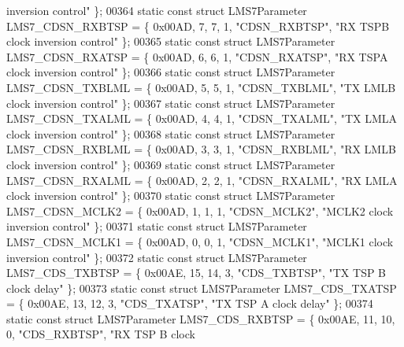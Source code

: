 \begin{DoxyCode}
{       inversion control"} \};
00364 \textcolor{keyword}{static} \textcolor{keyword}{const} \textcolor{keyword}{struct }LMS7Parameter LMS7_CDSN_RXBTSP = \{ 0x00AD, 7, 7, 1, \textcolor{stringliteral}{"CDSN\_RXBTSP"}, \textcolor{stringliteral}{"RX TSPB clock
       inversion control"} \};
00365 \textcolor{keyword}{static} \textcolor{keyword}{const} \textcolor{keyword}{struct }LMS7Parameter LMS7_CDSN_RXATSP = \{ 0x00AD, 6, 6, 1, \textcolor{stringliteral}{"CDSN\_RXATSP"}, \textcolor{stringliteral}{"RX TSPA clock
       inversion control"} \};
00366 \textcolor{keyword}{static} \textcolor{keyword}{const} \textcolor{keyword}{struct }LMS7Parameter LMS7_CDSN_TXBLML = \{ 0x00AD, 5, 5, 1, \textcolor{stringliteral}{"CDSN\_TXBLML"}, \textcolor{stringliteral}{"TX LMLB clock
       inversion control"} \};
00367 \textcolor{keyword}{static} \textcolor{keyword}{const} \textcolor{keyword}{struct }LMS7Parameter LMS7_CDSN_TXALML = \{ 0x00AD, 4, 4, 1, \textcolor{stringliteral}{"CDSN\_TXALML"}, \textcolor{stringliteral}{"TX LMLA clock
       inversion control"} \};
00368 \textcolor{keyword}{static} \textcolor{keyword}{const} \textcolor{keyword}{struct }LMS7Parameter LMS7_CDSN_RXBLML = \{ 0x00AD, 3, 3, 1, \textcolor{stringliteral}{"CDSN\_RXBLML"}, \textcolor{stringliteral}{"RX LMLB clock
       inversion control"} \};
00369 \textcolor{keyword}{static} \textcolor{keyword}{const} \textcolor{keyword}{struct }LMS7Parameter LMS7_CDSN_RXALML = \{ 0x00AD, 2, 2, 1, \textcolor{stringliteral}{"CDSN\_RXALML"}, \textcolor{stringliteral}{"RX LMLA clock
       inversion control"} \};
00370 \textcolor{keyword}{static} \textcolor{keyword}{const} \textcolor{keyword}{struct }LMS7Parameter LMS7_CDSN_MCLK2 = \{ 0x00AD, 1, 1, 1, \textcolor{stringliteral}{"CDSN\_MCLK2"}, \textcolor{stringliteral}{"MCLK2 clock inversion
       control"} \};
00371 \textcolor{keyword}{static} \textcolor{keyword}{const} \textcolor{keyword}{struct }LMS7Parameter LMS7_CDSN_MCLK1 = \{ 0x00AD, 0, 0, 1, \textcolor{stringliteral}{"CDSN\_MCLK1"}, \textcolor{stringliteral}{"MCLK1 clock inversion
       control"} \};
00372 \textcolor{keyword}{static} \textcolor{keyword}{const} \textcolor{keyword}{struct }LMS7Parameter LMS7_CDS_TXBTSP = \{ 0x00AE, 15, 14, 3, \textcolor{stringliteral}{"CDS\_TXBTSP"}, \textcolor{stringliteral}{"TX TSP B clock
       delay"} \};
00373 \textcolor{keyword}{static} \textcolor{keyword}{const} \textcolor{keyword}{struct }LMS7Parameter LMS7_CDS_TXATSP = \{ 0x00AE, 13, 12, 3, \textcolor{stringliteral}{"CDS\_TXATSP"}, \textcolor{stringliteral}{"TX TSP A clock
       delay"} \};
00374 \textcolor{keyword}{static} \textcolor{keyword}{const} \textcolor{keyword}{struct }LMS7Parameter LMS7_CDS_RXBTSP = \{ 0x00AE, 11, 10, 0, \textcolor{stringliteral}{"CDS\_RXBTSP"}, \textcolor{stringliteral}{"RX TSP B clock
}
\end{DoxyCode}
